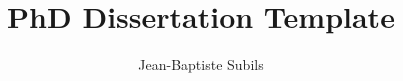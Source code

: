 \documentclass[12pt,frontmatter,copyright,dissertation]{usfmanus}
\title{PhD Dissertation Template} %
\author{Jean-Baptiste Subils} %
\begin{document}


\nocite{JB_Diss}

\begin{spacing}{1}


\end{spacing}

\begin{appendices}

\end{appendices}
\end{document}
